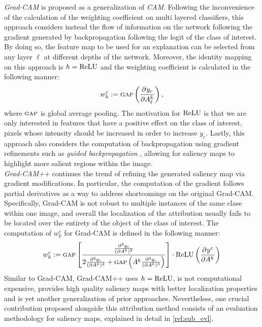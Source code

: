 \noindent\emph{Grad-CAM} \autocite{selvaraju2017grad} is proposed as a generalization of \emph{CAM}. 
Following the inconvenience of the calculation of the weighting coefficient on multi layered 
classifiers, this approach considers instead the flow of information on the network following the 
gradient generated by backpropagation following the logit of the class of interest. By doing so, 
the feature map to be used for an explanation can be selected from any
layer $\ell$ at different depths of the network. Moreover, the identity mapping on this approach is 
$h = {\operatorname{ReLU}} $ and the weighting coefficient is calculated in the following manner:
\begin{equation}
	w^c_k \mathrel{:=} {\textsc{gap}} \left( \frac{\partial^{}{y_c}}{\partial{{A^k_\ell}^{}}} \right),
\label{eq:gcam_coeff}
\end{equation}
where ${\textsc{gap}}$ is global average pooling.
The motivation for ${\operatorname{ReLU}}$ is that we are only interested in features that have a positive effect 
on the class of interest, \ie pixels whose intensity should be increased in order to increase $y_c$. 
Lastly, this approach also considers the computation of backpropagation using gradient refinements 
such as \emph{guided backpropagation} \autocite{guidedbackprop}, allowing for saliency maps to 
highlight more salient regions within the image.\\

\noindent \emph{Grad-CAM++} \autocite{chattopadhay2018grad} continues the trend of refining the 
generated saliency map via gradient modifications. In particular, the computation of the gradient 
follows partial derivatives as a way to address shortcomings on the original Grad-CAM. Specifically, 
Grad-CAM is not robust to multiple instances of the same clase within one image, and overall the 
localization of the attribution usually fails to be located over the entirety of the object of 
the class of interest. The computation of $w^c_k$ for Grad-CAM is defined in the following manner:
\begin{equation}
	w^c_k \mathrel{:=} {\textsc{gap}} \left[\frac{\frac{\partial^2 y_c}{(\partial A^k)^2}}{2\frac{\partial^2 y_c}
	{(\partial A^k)^2}+{\textsc{gap}}\left(A^k \frac{\partial^3 y_c}{(\partial A^k)^3}\right)}\right] \cdot 
	{\operatorname{ReLU}} \left(\frac{\partial^{}{y^c}}{\partial{{A^k}^{}}}\right)
	\label{eq:gcampp_coeff}
\end{equation}
Similar to Grad-CAM, Grad-CAM++ uses $h = {\operatorname{ReLU}}$, is not computational expensive, 
provides high quality saliency maps with better localization properties and is yet another 
generalization of prior approaches. Nevertheless, one crucial contribution proposed alongside this 
attribution method consists of an evaluation methodology for saliency maps, explained in detail in 
\autoref{rel:sub_evl}.\\

